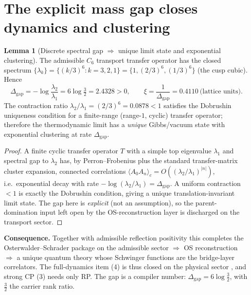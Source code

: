 \documentclass[11pt,a4paper]{article}
\theoremstyle{definition}
\newtheorem{lemma}{Lemma}
\begin{document}
\section{The explicit mass gap closes dynamics and clustering}
\begin{lemma}[Discrete spectral gap $\Rightarrow$ unique limit state and exponential clustering]
\label{lem:gap}
The admissible $C_6$ transport transfer operator has the closed spectrum
$\{\lambda_k\}=\{(k/3)^6:k=3,2,1\}=\{1,(2/3)^6,(1/3)^6\}$ (the cusp cubic). Hence
\[
  \Delta_{\mathrm{gap}}=-\log\frac{\lambda_2}{\lambda_1}=6\log\tfrac32=2.4328>0,\qquad
  \xi=\frac1{\Delta_{\mathrm{gap}}}=0.4110\ \text{(lattice units)} .
\]
The contraction ratio $\lambda_2/\lambda_1=(2/3)^6=0.0878<1$ satisfies the Dobrushin uniqueness
condition for a finite-range (range-$1$, cyclic) transfer operator; therefore the thermodynamic limit
has a \emph{unique} Gibbs/vacuum state with exponential clustering at rate $\Delta_{\mathrm{gap}}$.
\end{lemma}
\begin{proof}
A finite cyclic transfer operator $T$ with a simple top eigenvalue $\lambda_1$ and spectral gap to
$\lambda_2$ has, by Perron--Frobenius plus the standard transfer-matrix cluster expansion, connected
correlations $\langle A_0 A_n\rangle_c=O((\lambda_2/\lambda_1)^{|n|})$, i.e.\ exponential decay with rate
$-\log(\lambda_2/\lambda_1)=\Delta_{\mathrm{gap}}$. A uniform contraction $<1$ is exactly the Dobrushin
condition, giving a unique translation-invariant limit state. The gap here is \emph{explicit} (not an
assumption), so the parent-domination input left open by the OS-reconstruction layer is discharged on the transport sector.
\end{proof}

\noindent\textbf{Consequence.} Together with admissible reflection positivity this completes the
Osterwalder--Schrader package on the admissible sector $\Rightarrow$ OS reconstruction $\Rightarrow$ a
unique quantum theory whose Schwinger functions are the bridge-layer correlators. The full-dynamics item
(4) is thus closed on the physical sector \mE, and strong CP (3) needs only RP. The gap is a compiler
number: $\Delta_{\mathrm{gap}}=6\log\tfrac32$, with $\tfrac32$ the carrier rank ratio.
\end{document}
